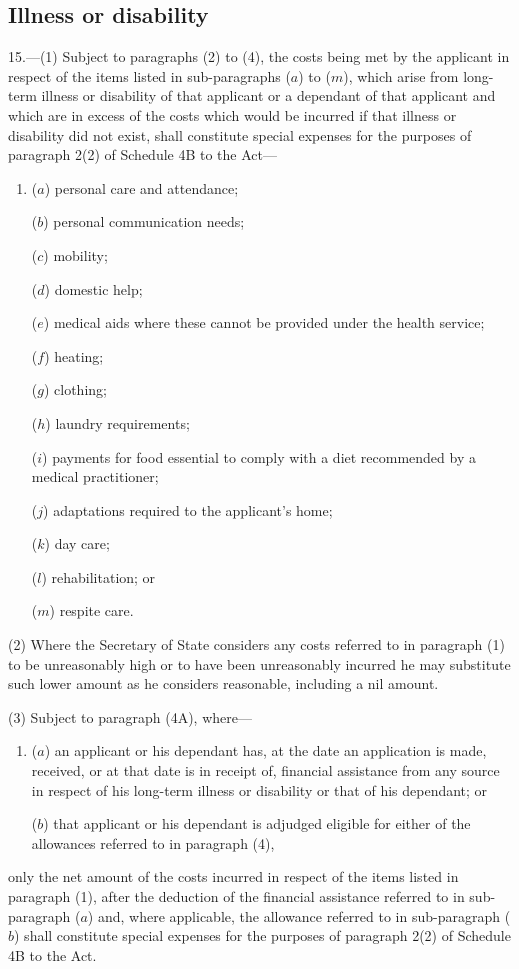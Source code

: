 \documentclass[12pt,a4paper]{article}
\begin{document}

\subsection[15. Illness or disability]{Illness or disability}

15.—(1) Subject to paragraphs (2) to (4), the costs being
met by the applicant in respect of the items listed in sub-paragraphs ($a$) to
($m$), which arise from long-term illness or disability of that applicant or a
dependant of that applicant and which are in excess of the costs which would be
incurred if that illness or disability did not exist, shall constitute special
expenses for the purposes of paragraph 2(2) of Schedule 4B to the Act—
\begin{enumerate}\item[]
($a$) personal care and attendance;

($b$) personal communication needs;

($c$) mobility;

($d$) domestic help;

($e$) medical aids where these cannot be provided under the health service;

($f$) heating;

($g$) clothing;

($h$) laundry requirements;

($i$) payments for food essential to comply with a diet recommended by a medical
practitioner;

($j$) adaptations required to the applicant’s home;

($k$) day care;

($l$) rehabilitation; or

($m$) respite care.
\end{enumerate}

(2) Where the Secretary of State considers any costs referred to in paragraph
(1) to be unreasonably high or to have been unreasonably incurred he may
substitute such lower amount as he considers reasonable, including a nil amount.

(3) 
Subject to paragraph (4A),  %
where—
\begin{enumerate}\item[]
($a$) an applicant or his dependant has, at the date an application is made,
received, or at that date is in receipt of, financial assistance from any source
in respect of his long-term illness or disability or that of his dependant; or

($b$) that applicant or his dependant is adjudged eligible for either of the
allowances referred to in paragraph (4),
\end{enumerate}
only the net amount of the costs incurred in respect of the items listed in
paragraph (1), after the deduction of the financial assistance referred to in
sub-paragraph ($a$) and, where applicable, the allowance referred to in
sub-paragraph ($b$) shall constitute special expenses for the purposes of
paragraph 2(2) of Schedule 4B to the Act.
\end{document}
